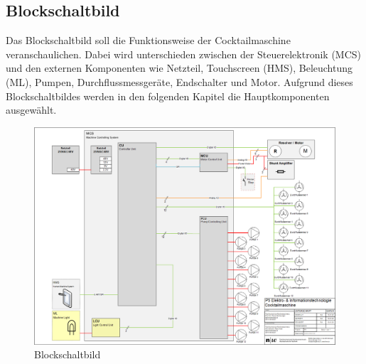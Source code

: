 \subsection{Blockschaltbild}\label{subsec:Blockschaltbild}

Das Blockschaltbild soll die Funktionsweise der Cocktailmaschine veranschaulichen. Dabei wird unterschieden zwischen der Steuerelektronik (MCS) und den externen Komponenten wie Netzteil, Touchscreen (HMS), Beleuchtung (ML), Pumpen, Durchflussmessgeräte, Endschalter und Motor. Aufgrund dieses Blockschaltbildes werden in den folgenden Kapitel die Hauptkomponenten ausgewählt.

\begin{figure}[h!]
	\centering
	\includegraphics[angle=90, width=\textwidth]{graphics/P5-Blockschema.png}
	\caption{Blockschaltbild}
	\label{fig:Blockschaltbild}
\end{figure}  

\newpage  